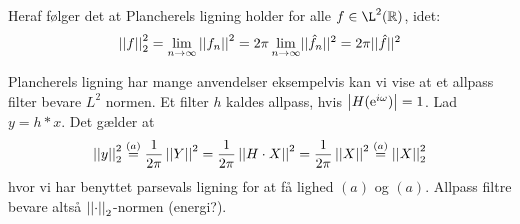 Heraf følger det at Plancherels ligning holder for alle $f \in \L^{2}(\R)$, idet:
\begin{equation*}
  \left|\left|f\right|\right|_{2}^{2} = \lim_{n \to \infty} \left|\left|f_{n}\right|\right|^{2} = 2\pi \lim_{n \to \infty} \lvert \lvert \hat{f}_{n} \rvert \rvert^{2} = 2\pi \lvert \lvert \hat{f} \rvert \rvert^{2}
\end{equation*}

Plancherels ligning har mange anvendelser eksempelvis kan vi vise at et allpass filter bevare $L^{2}$ normen.
Et filter $h$ kaldes allpass, hvis $\left|H(\mathrm{e}^{i \omega})\right| = 1$.
Lad $y = h * x$. Det gælder at
\begin{equation*}
  \left|\left|y\right|\right|_{2}^{2} \stackrel{(a)}= \frac{1}{2\pi} \left|\left|Y\right|\right|^{2} = \frac{1}{2\pi} \left|\left|H \cdot X\right|\right|^{2} = \frac{1}{2\pi} \left|\left|X\right|\right|^{2} \stackrel{(a)}= \left|\left|X\right|\right|_{2}^{2}
\end{equation*}
hvor vi har benyttet parsevals ligning for at få lighed $(a)$ og $(a)$.
Allpass filtre bevare altså $\left|\left|\cdot\right|\right|_{2}$-normen (energi?).
